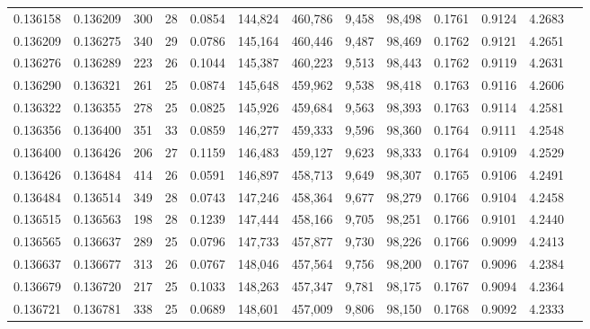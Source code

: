 \begin{tabular}{rrrrrrrrrrrrr}
0.136158 & 0.136209 & 300 &  28 &                                     0.0854 & 144,824 & 460,786 &   9,458 &  98,498 & 0.1761 & 0.9124 & 4.2683 \\
0.136209 & 0.136275 & 340 &  29 &                                     0.0786 & 145,164 & 460,446 &   9,487 &  98,469 & 0.1762 & 0.9121 & 4.2651 \\
0.136276 & 0.136289 & 223 &  26 &                                     0.1044 & 145,387 & 460,223 &   9,513 &  98,443 & 0.1762 & 0.9119 & 4.2631 \\
0.136290 & 0.136321 & 261 &  25 &                                     0.0874 & 145,648 & 459,962 &   9,538 &  98,418 & 0.1763 & 0.9116 & 4.2606 \\
0.136322 & 0.136355 & 278 &  25 &                                     0.0825 & 145,926 & 459,684 &   9,563 &  98,393 & 0.1763 & 0.9114 & 4.2581 \\
0.136356 & 0.136400 & 351 &  33 &                                     0.0859 & 146,277 & 459,333 &   9,596 &  98,360 & 0.1764 & 0.9111 & 4.2548 \\
0.136400 & 0.136426 & 206 &  27 &                                     0.1159 & 146,483 & 459,127 &   9,623 &  98,333 & 0.1764 & 0.9109 & 4.2529 \\
0.136426 & 0.136484 & 414 &  26 &                                     0.0591 & 146,897 & 458,713 &   9,649 &  98,307 & 0.1765 & 0.9106 & 4.2491 \\
0.136484 & 0.136514 & 349 &  28 &                                     0.0743 & 147,246 & 458,364 &   9,677 &  98,279 & 0.1766 & 0.9104 & 4.2458 \\
0.136515 & 0.136563 & 198 &  28 &                                     0.1239 & 147,444 & 458,166 &   9,705 &  98,251 & 0.1766 & 0.9101 & 4.2440 \\
0.136565 & 0.136637 & 289 &  25 &                                     0.0796 & 147,733 & 457,877 &   9,730 &  98,226 & 0.1766 & 0.9099 & 4.2413 \\
0.136637 & 0.136677 & 313 &  26 &                                     0.0767 & 148,046 & 457,564 &   9,756 &  98,200 & 0.1767 & 0.9096 & 4.2384 \\
0.136679 & 0.136720 & 217 &  25 &                                     0.1033 & 148,263 & 457,347 &   9,781 &  98,175 & 0.1767 & 0.9094 & 4.2364 \\
0.136721 & 0.136781 & 338 &  25 &                                     0.0689 & 148,601 & 457,009 &   9,806 &  98,150 & 0.1768 & 0.9092 & 4.2333 \\

\end{tabular}
